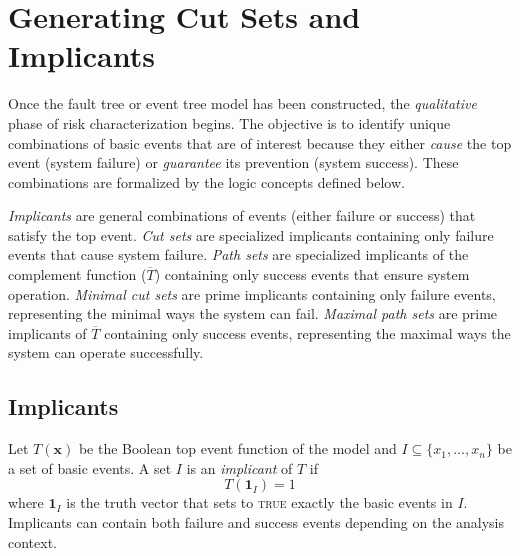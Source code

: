\section{Generating Cut Sets and Implicants}


Once the fault tree or event tree model has been constructed, the \emph{qualitative} phase of risk characterization begins. The objective is to identify unique combinations of basic events that are of interest because they either \emph{cause} the top event (system failure) or \emph{guarantee} its prevention (system success). These combinations are formalized by the logic concepts defined below.

\emph{Implicants} are general combinations of events (either failure or success) that satisfy the top event. \emph{Cut sets} are specialized implicants containing only failure events that cause system failure. \emph{Path sets} are specialized implicants of the complement function ($\overline{T}$) containing only success events that ensure system operation. \emph{Minimal cut sets} are prime implicants containing only failure events, representing the minimal ways the system can fail. \emph{Maximal path sets} are prime implicants of $\overline{T}$ containing only success events, representing the maximal ways the system can operate successfully. 

\subsection{Implicants}
Let $T(\mathbf{x})$ be the Boolean top event function of the model and $I \subseteq \{x_1, \dots, x_n\}$ be a set of basic events. A set $I$ is an \emph{implicant} of $T$ if
\[
T(\mathbf{1}_I) = 1
\]
where $\mathbf{1}_I$ is the truth vector that sets to \textsc{true} exactly the basic events in $I$. Implicants can contain both failure and success events depending on the analysis context.

